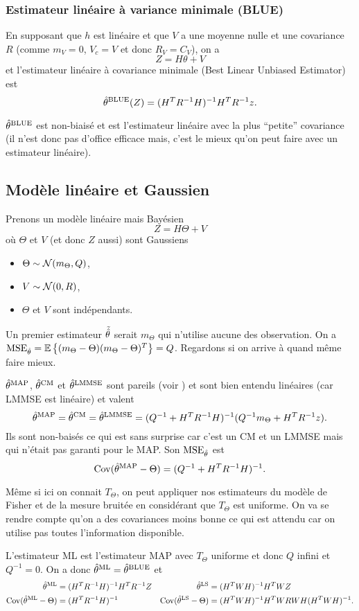 \subsubsection{Estimateur linéaire à variance minimale (BLUE)}
En supposant que $h$ est linéaire et que
$V$ a une moyenne nulle et une covariance $R$
(comme $m_V = 0$, $V_c = V$ et donc $R_V = C_V$),
on a
\[ Z = H\theta + V \]
et
l'estimateur linéaire à covariance minimale (Best Linear Unbiased Estimator)
est
\[ \hat{\theta}^{\mathrm{BLUE}}(Z) = (H^TR^{-1}H)^{-1}H^TR^{-1}z. \]

$\hat{\theta}^{\mathrm{BLUE}}$ est non-biaisé et est l'estimateur linéaire avec la plus ``petite'' covariance
(il n'est donc pas d'office efficace mais, c'est le mieux qu'on peut faire avec un estimateur linéaire).

\subsection{Modèle linéaire et Gaussien}
\label{sec:lingauss}
Prenons un modèle linéaire mais Bayésien
\[ Z = H\Theta + V \]
où $\Theta$ et $V$ (et donc $Z$ aussi) sont Gaussiens
\begin{itemize}
  \item $\Theta \sim \mathcal{N}(m_\Theta, Q)$,
  \item $V \sim \mathcal{N}(0, R)$,
  \item $\Theta$ et $V$ sont indépendants.
\end{itemize}

Un premier estimateur $\tilde{\hat{\theta}}$ serait $m_\Theta$
qui n'utilise aucune des observation.
On a $\mathrm{MSE}_{\hat{\theta}} = \mathbb{E}\left\{(m_\Theta-\Theta)(m_\Theta-\Theta)^T\right\} = Q$.
Regardons si on arrive à quand même faire mieux.

$\hat{\theta}^{\mathrm{MAP}}$, $\hat{\theta}^{\mathrm{CM}}$ et $\hat{\theta}^{\mathrm{LMMSE}}$ sont pareils
(voir ) et sont
bien entendu linéaires (car LMMSE est linéaire) et valent
\[ \hat{\theta}^{\mathrm{MAP}} = \hat{\theta}^{\mathrm{CM}} = \hat{\theta}^{\mathrm{LMMSE}} = (Q^{-1} + H^TR^{-1}H)^{-1}(Q^{-1}m_\Theta + H^TR^{-1}z). \]
Ils sont non-baisés ce qui est sans surprise car c'est un CM et un LMMSE
mais qui n'était pas garanti pour le MAP.
Son $\mathrm{MSE}_{\hat{\theta}}$ est
\[ \operatorname{Cov}(\hat{\theta}^{\mathrm{MAP}}-\Theta) = (Q^{-1} + H^TR^{-1}H)^{-1}. \]

Même si ici on connait $T_\Theta$, on peut
appliquer nos estimateurs du modèle de Fisher et
de la mesure bruitée en considérant que $T_\Theta$ est uniforme.
On va se rendre compte qu'on a des covariances moins bonne ce
qui est attendu car on utilise pas toutes l'information disponible.

L'estimateur ML est l'estimateur MAP avec $T_\Theta$ uniforme et
donc $Q$ infini et $Q^{-1} = 0$.
On a donc $\hat{\theta}^{\mathrm{ML}} = \hat{\theta}^{\mathrm{BLUE}}$ et
\begin{align*}
  \hat{\theta}^{\mathrm{ML}} & = (H^TR^{-1}H)^{-1}H^TR^{-1}Z &
  \hat{\theta}^{\mathrm{LS}} & = (H^TWH)^{-1}H^TWZ\\
  \operatorname{Cov}(\hat{\theta}^{\mathrm{ML}} - \Theta) & = (H^TR^{-1}H)^{-1} &
  \operatorname{Cov}(\hat{\theta}^{\mathrm{LS}} - \Theta) & = (H^TWH)^{-1}H^TWRWH(H^TWH)^{-1}.
\end{align*}

